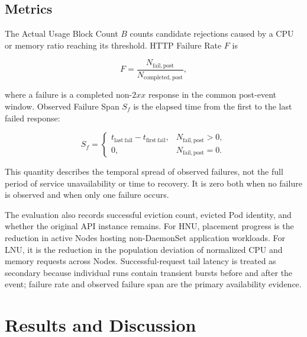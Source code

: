 \subsection{Metrics}

The Actual Usage Block Count \(B\) counts candidate rejections caused by a CPU
or memory ratio reaching its threshold. HTTP Failure Rate \(F\) is

\[
F=
\frac{N_{\mathrm{fail,post}}}
     {N_{\mathrm{completed,post}}},
\]

where a failure is a completed non-\(2xx\) response in the common post-event
window. Observed Failure Span \(S_f\) is the elapsed time from the first to the
last failed response:

\[
S_f=
\begin{cases}
t_{\mathrm{last\ fail}}-t_{\mathrm{first\ fail}},
    & N_{\mathrm{fail,post}}>0,\\
0, & N_{\mathrm{fail,post}}=0.
\end{cases}
\]

This quantity describes the temporal spread of observed failures, not the full
period of service unavailability or time to recovery. It is zero both when no
failure is observed and when only one failure occurs.

The evaluation also records successful eviction count, evicted Pod identity,
and whether the original API instance remains. For HNU, placement progress is
the reduction in active Nodes hosting non-DaemonSet application workloads.
For LNU, it is the reduction in the population deviation of normalized CPU
and memory requests across Nodes. Successful-request tail latency is treated
as secondary because individual runs contain transient bursts before and
after the event; failure rate and observed failure span are the primary
availability evidence.

\section{Results and Discussion}
\label{sec:results}

